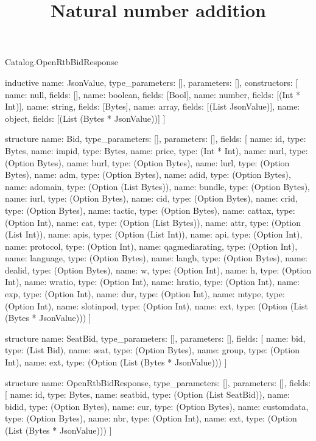 \begin{lexlean}{Catalog.OpenRtbBidResponse}
\title{Natural number addition}
\begin{semanticmodule}
inductive{
  name: JsonValue,
  type_parameters: [],
  parameters: [],
  constructors: [
    {name: null, fields: []},
    {name: boolean, fields: [Bool]},
    {name: number, fields: [(Int * Int)]},
    {name: string, fields: [Bytes]},
    {name: array, fields: [(List JsonValue)]},
    {name: object, fields: [(List (Bytes * JsonValue))]}
  ]
}

structure{
  name: Bid,
  type_parameters: [],
  parameters: [],
  fields: [
    {name: id, type: Bytes},
    {name: impid, type: Bytes},
    {name: price, type: (Int * Int)},
    {name: nurl, type: (Option Bytes)},
    {name: burl, type: (Option Bytes)},
    {name: lurl, type: (Option Bytes)},
    {name: adm, type: (Option Bytes)},
    {name: adid, type: (Option Bytes)},
    {name: adomain, type: (Option (List Bytes))},
    {name: bundle, type: (Option Bytes)},
    {name: iurl, type: (Option Bytes)},
    {name: cid, type: (Option Bytes)},
    {name: crid, type: (Option Bytes)},
    {name: tactic, type: (Option Bytes)},
    {name: cattax, type: (Option Int)},
    {name: cat, type: (Option (List Bytes))},
    {name: attr, type: (Option (List Int))},
    {name: apis, type: (Option (List Int))},
    {name: api, type: (Option Int)},
    {name: protocol, type: (Option Int)},
    {name: qagmediarating, type: (Option Int)},
    {name: language, type: (Option Bytes)},
    {name: langb, type: (Option Bytes)},
    {name: dealid, type: (Option Bytes)},
    {name: w, type: (Option Int)},
    {name: h, type: (Option Int)},
    {name: wratio, type: (Option Int)},
    {name: hratio, type: (Option Int)},
    {name: exp, type: (Option Int)},
    {name: dur, type: (Option Int)},
    {name: mtype, type: (Option Int)},
    {name: slotinpod, type: (Option Int)},
    {name: ext, type: (Option (List (Bytes * JsonValue)))}
  ]
}

structure{
  name: SeatBid,
  type_parameters: [],
  parameters: [],
  fields: [
    {name: bid, type: (List Bid)},
    {name: seat, type: (Option Bytes)},
    {name: group, type: (Option Int)},
    {name: ext, type: (Option (List (Bytes * JsonValue)))}
  ]
}

structure{
  name: OpenRtbBidResponse,
  type_parameters: [],
  parameters: [],
  fields: [
    {name: id, type: Bytes},
    {name: seatbid, type: (Option (List SeatBid))},
    {name: bidid, type: (Option Bytes)},
    {name: cur, type: (Option Bytes)},
    {name: customdata, type: (Option Bytes)},
    {name: nbr, type: (Option Int)},
    {name: ext, type: (Option (List (Bytes * JsonValue)))}
  ]
}
\end{semanticmodule}
\end{lexlean}
